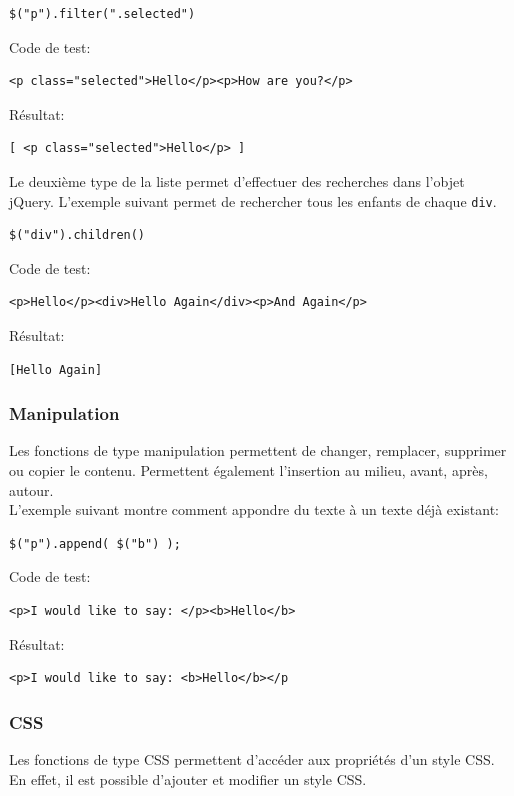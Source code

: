 \documentclass[10pt,a4paper,titlepage]{article}
\begin{document}
\begin{lstlisting}
$("p").filter(".selected")
\end{lstlisting}

Code de test:
\begin{lstlisting}
<p class="selected">Hello</p><p>How are you?</p>
\end{lstlisting}

Résultat:
\begin{lstlisting}
[ <p class="selected">Hello</p> ]
\end{lstlisting}

Le deuxième type de la liste permet d'effectuer des recherches dans l'objet jQuery. L'exemple suivant permet de rechercher tous les enfants de chaque \texttt{div}.

\begin{lstlisting}
$("div").children()
\end{lstlisting}


Code de test:
\begin{lstlisting}
<p>Hello</p><div>Hello Again</div><p>And Again</p>
\end{lstlisting}


Résultat:
\begin{lstlisting}
[Hello Again]
\end{lstlisting}

\subsubsection{Manipulation}
Les fonctions de type manipulation permettent de changer, remplacer, supprimer ou copier le contenu. Permettent également l'insertion au milieu, avant, après, autour.\\

L'exemple suivant montre comment appondre du texte à un texte déjà existant:
\begin{lstlisting}
$("p").append( $("b") );
\end{lstlisting}

Code de test:
\begin{lstlisting}
<p>I would like to say: </p><b>Hello</b>
\end{lstlisting}

Résultat:
\begin{lstlisting}
<p>I would like to say: <b>Hello</b></p
\end{lstlisting}

\subsubsection{CSS}
Les fonctions de type CSS permettent d'accéder aux propriétés d'un style CSS. En effet, il est possible d'ajouter et modifier un style CSS.\\
\end{document}
